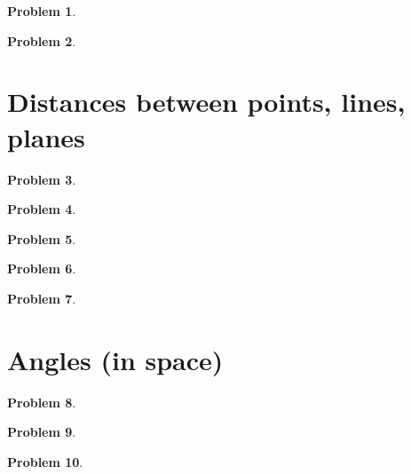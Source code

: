 \documentclass{article}
\newtheorem{problem}{Problem}
\begin{document}
\begin{problem}

\end{problem}

\begin{problem}

\end{problem}

\section{Distances between points, lines, planes}

\begin{problem}

\end{problem}


\begin{problem}

\end{problem}


\begin{problem}

\end{problem}

\begin{problem}

\end{problem}

\begin{problem}

\end{problem}



\section{Angles (in space)}

\begin{problem}

\end{problem}

\begin{problem}

\end{problem}

\begin{problem}

\end{problem}
\end{document}

